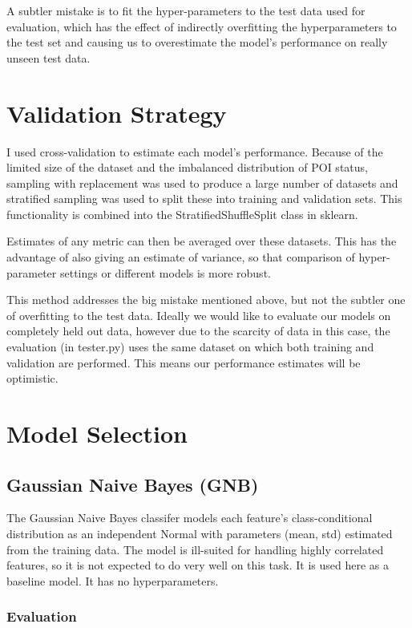 \documentclass{article}
\begin{document}
A subtler mistake is to fit the hyper-parameters to the test data used for evaluation, which has the effect of indirectly overfitting the hyperparameters to the test set and causing us to overestimate the model's performance on really unseen test data.

\section{Validation Strategy}

I used cross-validation to estimate each model's performance. Because of the limited size of the dataset and the imbalanced distribution of POI status, sampling with replacement was used to produce a large number of datasets and stratified sampling was used to split these into training and validation sets. This functionality is combined into the StratifiedShuffleSplit class in sklearn.

Estimates of any metric can then be averaged over these datasets. This has the advantage of also giving an estimate of variance, so that comparison of hyper-parameter settings or different models is more robust.

This method addresses the big mistake mentioned above, but not the subtler one of overfitting to the test data. Ideally we would like to evaluate our models on completely held out data, however due to the scarcity of data in this case, the evaluation (in tester.py) uses the same dataset on which both training and validation are performed. This means our performance estimates will be optimistic.


\section{Model Selection}


\subsection{Gaussian Naive Bayes (GNB)}

The Gaussian Naive Bayes classifer models each feature's class-conditional distribution as an independent Normal with parameters (mean, std) estimated from the training data. The model is ill-suited for handling highly correlated features, so it is not expected to do very well on this task. It is used here as a baseline model. It has no hyperparameters.

\subsubsection{Evaluation}
\end{document}
